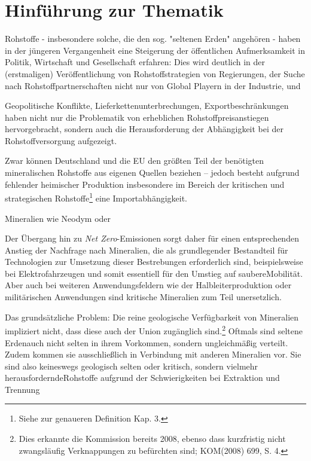 \documentclass[12pt,a4paper,oneside]{book} %
\begin{document}
	
	
	
	\tableofcontents
	
	\chapter{Hinführung zur Thematik}
	
	Rohstoffe - insbesondere solche, die den sog. "seltenen Erden" angehören - haben in der jüngeren Vergangenheit eine Steigerung der öffentlichen Aufmerksamkeit in Politik, Wirtschaft und Gesellschaft erfahren: Dies wird deutlich in der (erstmaligen) Veröffentlichung von Rohstoffstrategien von Regierungen, der Suche nach Rohstoffpartnerschaften nicht nur von Global Playern in der Industrie, und 
	
	Geopolitische Konflikte, Lieferkettenunterbrechungen, Exportbeschränkungen haben nicht nur die Problematik von erheblichen Rohstoffpreisanstiegen hervorgebracht, sondern auch die Herausforderung der Abhängigkeit bei der Rohstoffversorgung aufgezeigt. 
	
	Zwar können Deutschland und die EU den größten Teil der benötigten mineralischen Rohstoffe aus eigenen Quellen beziehen -- jedoch besteht aufgrund fehlender heimischer Produktion insbesondere im Bereich der kritischen und strategischen Rohstoffe\footnote{Siehe zur genaueren Definition Kap. 3.} eine Importabhängigkeit.\autocite{	Commodity TopNews 73, S. 3}
	
	Mineralien wie Neodym oder 
	
	Der Übergang hin zu \textit{Net Zero}-Emissionen sorgt daher für einen entsprechenden Anstieg der Nachfrage nach Mineralien, die als grundlegender Bestandteil für Technologien zur Umsetzung dieser Bestrebungen erforderlich sind, beispielsweise bei Elektrofahrzeugen und somit essentiell für den Umstieg auf \glqq saubere\grqq Mobilität. Aber auch bei weiteren Anwendungsfeldern wie der Halbleiterproduktion oder militärischen Anwendungen sind kritische Mineralien zum Teil unersetzlich.
	
	Das grundsätzliche Problem: Die reine geologische Verfügbarkeit von Mineralien impliziert nicht, dass diese auch der Union zugänglich sind.\footnote{Dies erkannte die Kommission bereits 2008, ebenso dass kurzfristig nicht zwangsläufig Verknappungen zu befürchten sind; KOM(2008) 699, S. 4.} Oftmals sind \glqq seltene Erden\grqq auch nicht selten in ihrem Vorkommen, sondern ungleichmäßig verteilt. Zudem kommen sie ausschließlich in Verbindung mit anderen Mineralien vor. Sie sind also keineswegs geologisch selten oder kritisch, sondern vielmehr \glqq herausfordernde\grqq Rohstoffe aufgrund der Schwierigkeiten bei Extraktion und Trennung
	
\end{document}

